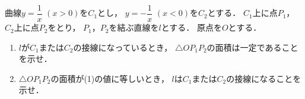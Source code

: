 \documentclass[../../main.tex]{subfiles}
\begin{document}
曲線$\displaystyle y=\dfrac{1}{x}$ $(x>0)$を$C_1$とし，
$\displaystyle y=-\dfrac{1}{x}$ $(x<0)$を$C_2$とする．
$C_1$上に点$P_1$，$C_2$上に点$P_2$をとり，
$P_1$，$P_2$を結ぶ直線を$l$とする．
原点を$O$とする．
\begin{enumerate}
  \item $l$が$C_1$または$C_2$の接線になっているとき，
    $\triangle OP_1P_2$の面積は一定であることを示せ．
  \item $\triangle OP_1P_2$の面積が(1)の値に等しいとき，
    $l$は$C_1$または$C_2$の接線になることを示せ．
\end{enumerate}
\end{document}

